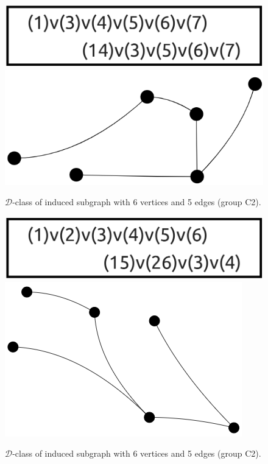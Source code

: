 \begin{appendices}
\begin{figure}[H]
\includegraphics[scale=0.14]{images/x9/x9_6v_5e_2.png}
\includegraphics[scale=0.08]{images/x9/x9_6v_5e_2_vis.png}
\caption{$\mathcal{D}$-class of induced subgraph with 6 vertices and 5 edges (group C2).}
\end{figure}

\begin{figure}[H]
\includegraphics[scale=0.14]{images/x9/x9_6v_5e_3.png}
\includegraphics[scale=0.1]{images/x9/x9_6v_5e_3_vis.png}
\caption{$\mathcal{D}$-class of induced subgraph with 6 vertices and 5 edges (group C2).}
\end{figure}


\end{appendices}
